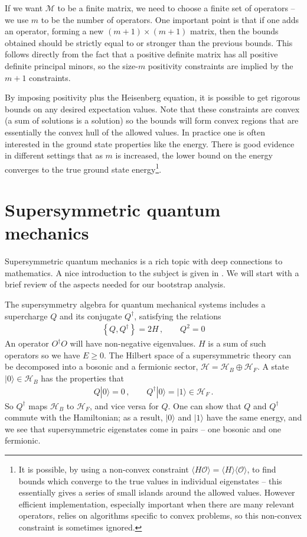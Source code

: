 \documentclass[a4paper,11pt]{article}
\newcommand{\M}{{\mathcal M}}
\numberwithin{equation}{section}
\begin{document}
If we want $\M$ to be a finite matrix, we need to choose a finite set of operators -- we use $m$ to be the number of operators. One important point is that if one adds an operator, forming a new $(m+1)\times(m+1)$ matrix, then the bounds obtained should be strictly equal to or stronger than the previous bounds. This follows directly from the fact that a positive definite matrix has all positive definite principal minors, so the size-$m$ positivity constraints are implied by the $m+1$ constraints. 

By imposing positivity plus the Heisenberg equation, it is possible to get rigorous bounds on any desired expectation values. Note that these constraints are convex (a sum of solutions is a solution) so the bounds will form convex regions that are essentially the convex hull of the allowed values. In practice one is often interested in the ground state properties like the energy. There is good evidence in different settings that as $m$ is increased, the lower bound on the energy converges to the true ground state energy\footnote{It is possible, by using a non-convex constraint $\langle H \mathcal{O} \rangle = \langle H \rangle \langle \mathcal{O} \rangle$, to find bounds which converge to the true values in individual eigenstates -- this essentially gives a series of small islands around the allowed values. However efficient implementation, especially important when there are many relevant operators, relies on algorithms specific to convex problems, so this non-convex constraint is sometimes ignored.}.

\section{Supersymmetric quantum mechanics}

Supersymmetric quantum mechanics is a rich topic with deep connections to mathematics. A nice introduction to the subject is given in \cite{Tong}. We will start with a brief review of the aspects needed for our bootstrap analysis.

The supersymmetry algebra for quantum mechanical systems includes a supercharge $Q$ and its conjugate $Q^\dagger$, satisfying the relations
%
\begin{align}
    \label{eq:alg}
    \left\{ Q, Q^\dagger \right\} = 2 H\, , \qquad Q^2 = 0
\end{align}
%
An operator $O^\dagger O$ will have non-negative eigenvalues. $H$ is a sum of such operators so we have $E \geq 0$. The Hilbert space of a supersymmetric theory can be decomposed into a bosonic and a fermionic sector, $\mathcal{H} = \mathcal{H}_B \oplus \mathcal{H}_F$. A state $|0 \rangle \in \mathcal{H}_B$ has the properties that 
%
\begin{align}
    Q | 0 \rangle = 0 \, , \qquad Q^\dagger|0\rangle = |1\rangle \in \mathcal H_F \, .
\end{align}
%
So $Q^\dagger$ maps $\mathcal H_B$ to $\mathcal H_F$, and vice versa for $Q$. One can show that $Q$ and $Q^\dagger$ commute with the Hamiltonian; as a result, $|0\rangle$ and $|1\rangle$ have the same energy, and we see that supersymmetric eigenstates come in pairs -- one bosonic and one fermionic.
\end{document}

